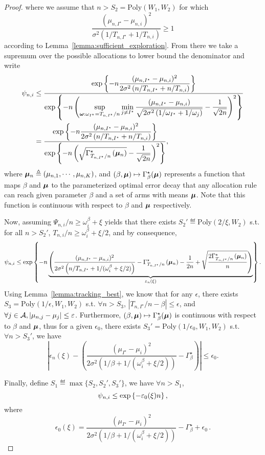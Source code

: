 \begin{proof}
where we assume that $n > S_2 = \text{Poly}(W_1,W_2)$ for which 
\[
    \frac{(\mu_{n,I^\star} - \mu_{n,i})^2}{\sigma^2\left(1/T_{n,I^\star} + 1/T_{n,i}\right)} \geq 1
\]
according to Lemma~\ref{lemma:sufficient_exploration}. From there we take a supremum over the possible allocations to lower bound the denominator and write  
\begin{align*}
    \psi_{n,i} &\leq \frac{\displaystyle \exp\left\{-n\frac{(\mu_{n,I^\star} - \mu_{n,i})^2}{2\sigma^2\left(n/T_{n,I^\star} + n/T_{n,i}\right)}\right\}}{\displaystyle \exp\left\{-n\left(\underset{{\boldsymbol \omega} : \omega_{I^\star} = T_{n,I^\star}/n}{\sup} \min_{j\neq I^\star}\frac{(\mu_{n,I^\star} - \mu_{n,i})}{\sqrt{2\sigma^2\left(1/\omega_{I^\star} + 1/\omega_{j}\right)}} -\frac{1}{\sqrt{2n}}\right)^2\right\}} \\
               &= \frac{\displaystyle \exp\left\{- n\frac{(\mu_{n,I^\star} - \mu_{n,i})^2}{2\sigma^2\left(n/T_{n,I^\star} + n/T_{n,i}\right)}\right\}}{\displaystyle \exp\left\{-n\left( \sqrt{\Gamma^\star_{T_{n,I^\star}/n}\left({\boldsymbol \mu}_n\right)} -\frac{1}{\sqrt{2n}}\right)^2\right\}},
\end{align*}
where ${\boldsymbol \mu}_n \triangleq (\mu_{n,1},\cdots,\mu_{n,K})$, and $(\beta,{\boldsymbol \mu})\mapsto \Gamma_{\beta}^\star({\boldsymbol \mu})$ represents a function that maps $\beta$ and ${\boldsymbol \mu}$ to the parameterized optimal error decay that any allocation rule can reach given parameter $\beta$ and a set of arms with means ${\boldsymbol \mu}$. Note that this function is continuous with respect to $\beta$ and ${\boldsymbol \mu}$ respectively.

Now, assuming $\Psi_{n,i}/n \geq \omega_{i}^\beta + \xi$ yields that there exists $S_2'\eqdef\text{Poly}(2/\xi,W_2)$ s.t. for all $n>S_2'$, $T_{n,i}/n \geq \omega_{i}^\beta + \xi/2$, and by consequence,
\[
    \psi_{n,i} \leq \exp\left\{-n\underbrace{\left(\frac{(\mu_{n,I^\star} - \mu_{n,i})^2}{2\sigma^2\left(n/T_{n,I^\star} + 1/(\omega_i^\beta + \xi/2)\right)} -\Gamma^\star_{T_{n,I^\star}/n}\left({\boldsymbol \mu}_{n}\right) - \frac{1}{2n} + \sqrt{\frac{2\Gamma^\star_{T_{n,I^\star}/n}\left({\boldsymbol \mu}_{n}\right)}{n}}\right)}_{\varepsilon_n(\xi)}\right\}.
\]
Using Lemma~\ref{lemma:tracking_best}, we know that for any $\epsilon$, there exists $S_3 = \text{Poly}(1/\epsilon,W_1,W_2)$ s.t. $\forall n > S_3$, $|T_{n,I^\star}/n - \beta| \leq \epsilon$, and $\forall j\in\mathcal{A}, |\mu_{n,j}-\mu_j| \leq \varepsilon$. Furthermore, $(\beta,{\boldsymbol \mu})\mapsto \Gamma_{\beta}^\star({\boldsymbol \mu})$ is continuous with respect to $\beta$ and ${\boldsymbol \mu}$, thus for a given $\epsilon_0$, there exists $S_3' = \text{Poly}(1/\epsilon_0,W_1,W_2)$ s.t. $\forall n > S_3'$, we have
\[
    \left|\epsilon_n(\xi) - \left(\frac{(\mu_{I^\star} - \mu_{i})^2}{2\sigma^2\left(1/\beta + 1/(\omega_i^\beta + \xi/2)\right)} - \Gamma_{\beta}^\star\right)\right| \leq \epsilon_0.
\]

Finally, define $S_1 \eqdef \max\{S_2,S_2',S_3'\}$, we have $\forall n > S_1$,
\[
    \psi_{n,i} \leq \exp\left\{-\varepsilon_0(\xi) n\right\},
\]
where
\begin{equation}
    \label{eq:def_epsilon0}
    \epsilon_0(\xi) = \frac{(\mu_{I^\star} - \mu_{i})^2}{2\sigma^2\left(1/\beta + 1/(\omega_i^\beta + \xi/2)\right)} - \Gamma_{\beta}^\star + \epsilon_0\,.
\end{equation}


\end{proof}

